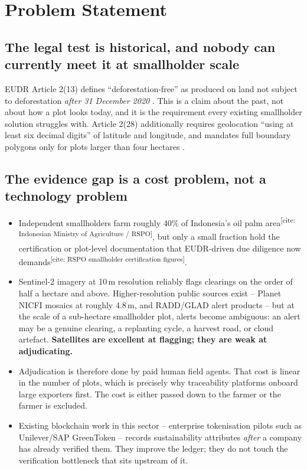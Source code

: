 \documentclass[11pt]{article}
\newcommand{\needcite}[1]{\textcolor{todoclr}{\small\textsuperscript{[cite: #1]}}}
\begin{document}
\section{Problem Statement}

\subsection{The legal test is historical, and nobody can currently meet it at smallholder scale}
EUDR Article 2(13) defines ``deforestation-free'' as produced on land not subject to deforestation \emph{after 31 December 2020} \cite{eudr-text}. This is a claim about the past, not about how a plot looks today, and it is the requirement every existing smallholder solution struggles with. Article 2(28) additionally requires geolocation ``using at least six decimal digits'' of latitude and longitude, and mandates full boundary polygons only for plots larger than four hectares \cite{eudr-text}.

\subsection{The evidence gap is a cost problem, not a technology problem}
\begin{itemize}[leftmargin=1.4em]
  \item Independent smallholders farm roughly 40\% of Indonesia's oil palm area\needcite{Indonesian Ministry of Agriculture / RSPO}, but only a small fraction hold the certification or plot-level documentation that EUDR-driven due diligence now demands\needcite{RSPO smallholder certification figures}.
  \item Sentinel-2 imagery at 10\,m resolution reliably flags clearings on the order of half a hectare and above. Higher-resolution public sources exist -- Planet NICFI mosaics at roughly 4.8\,m, and RADD/GLAD alert products -- but at the scale of a sub-hectare smallholder plot, alerts become ambiguous: an alert may be a genuine clearing, a replanting cycle, a harvest road, or cloud artefact. \textbf{Satellites are excellent at flagging; they are weak at adjudicating.}
  \item Adjudication is therefore done by paid human field agents. That cost is linear in the number of plots, which is precisely why traceability platforms onboard large exporters first. The cost is either passed down to the farmer or the farmer is excluded.
  \item Existing blockchain work in this sector -- enterprise tokenisation pilots such as Unilever/SAP GreenToken -- records sustainability attributes \emph{after} a company has already verified them. They improve the ledger; they do not touch the verification bottleneck that sits upstream of it.
\end{itemize}
\end{document}
